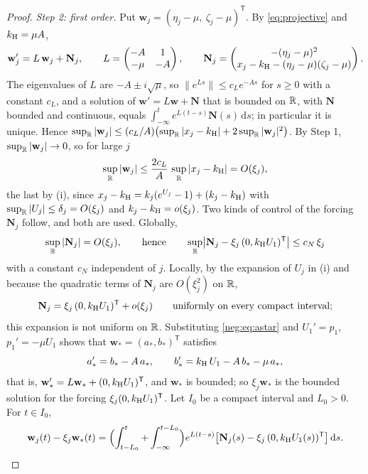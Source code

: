 \begin{proof}
\emph{Step 2: first order.} Put $\mathbf w_j=(\eta_j-\mu,\ \zeta_j-\mu)^{\mathsf T}$. By \eqref{eq:projective} and $k_{\mathrm H}=\mu A$,
\[
\mathbf w_j'=L\,\mathbf w_j+\mathbf N_j,\qquad L=\begin{pmatrix}-A&1\\-\mu&-A\end{pmatrix},\qquad
\mathbf N_j=\begin{pmatrix}-(\eta_j-\mu)^2\\ x_j-k_{\mathrm H}-(\eta_j-\mu)(\zeta_j-\mu)\end{pmatrix}.
\]
The eigenvalues of $L$ are $-A\pm i\sqrt\mu$, so $\|e^{Ls}\|\le c_Le^{-As}$ for $s\ge0$ with a constant $c_L$, and a solution of $\mathbf w'=L\mathbf w+\mathbf N$ that is bounded on $\mathbb R$, with $\mathbf N$ bounded and continuous, equals $\int_{-\infty}^te^{L(t-s)}\mathbf N(s)\,\mathrm ds$; in particular it is unique. Hence $\sup_\mathbb R|\mathbf w_j|\le(c_L/A)\bigl(\sup_\mathbb R|x_j-k_{\mathrm H}|+2\sup_\mathbb R|\mathbf w_j|^2\bigr)$. By Step 1, $\sup_\mathbb R|\mathbf w_j|\to0$, so for large $j$
\[
\sup_\mathbb R|\mathbf w_j|\le\frac{2c_L}{A}\,\sup_\mathbb R|x_j-k_{\mathrm H}|=O(\xi_j),
\]
the last by (i), since $x_j-k_{\mathrm H}=k_j(e^{U_j}-1)+(k_j-k_{\mathrm H})$ with $\sup_\mathbb R|U_j|\le\delta_j=O(\xi_j)$ and $k_j-k_{\mathrm H}=o(\xi_j)$. Two kinds of control of the forcing $\mathbf N_j$ follow, and both are used. Globally,
\[
\sup_\mathbb R|\mathbf N_j|=O(\xi_j),\qquad\text{hence}\qquad \sup_\mathbb R\bigl|\mathbf N_j-\xi_j\,(0,k_{\mathrm H} U_1)^{\mathsf T}\bigr|\le c_N\,\xi_j
\]
with a constant $c_N$ independent of $j$. Locally, by the expansion of $U_j$ in (i) and because the quadratic terms of $\mathbf N_j$ are $O(\xi_j^2)$ on $\mathbb R$,
\[
\mathbf N_j=\xi_j\,(0,k_{\mathrm H} U_1)^{\mathsf T}+o(\xi_j)\qquad\text{uniformly on every compact interval;}
\]
this expansion is not uniform on $\mathbb R$. Substituting \eqref{neg:eq:astar} and $U_1'=p_1$, $p_1'=-\mu U_1$ shows that $\mathbf w_*=(a_*,b_*)^{\mathsf T}$ satisfies
\begin{equation}\label{neg:eq:linriccati}
a_*'=b_*-A\,a_*,\qquad b_*'=k_{\mathrm H}\,U_1-A\,b_*-\mu\,a_* ,
\end{equation}
that is, $\mathbf w_*'=L\mathbf w_*+(0,k_{\mathrm H} U_1)^{\mathsf T}$, and $\mathbf w_*$ is bounded; so $\xi_j\mathbf w_*$ is the bounded solution for the forcing $\xi_j(0,k_{\mathrm H} U_1)^{\mathsf T}$. Let $I_0$ be a compact interval and $L_0>0$. For $t\in I_0$,
\[
\mathbf w_j(t)-\xi_j\mathbf w_*(t)=\Bigl(\int_{t-L_0}^t+\int_{-\infty}^{t-L_0}\Bigr)e^{L(t-s)}\bigl[\mathbf N_j(s)-\xi_j\,(0,k_{\mathrm H} U_1(s))^{\mathsf T}\bigr]\,\mathrm ds .
\]

\end{proof}
